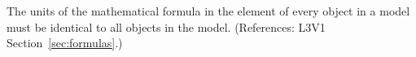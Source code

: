 The units of the mathematical formula in the  element of every
\KineticLaw object in a model must be identical to all \KineticLaw objects
in the model.  (References: L3V1 Section~\ref{sec:formulas}.)
